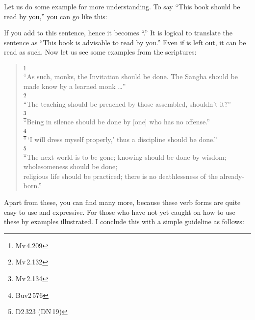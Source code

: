 Let us do some example for more understanding. To say ``This book should be read by you,'' you can go like this:


If you add  to this sentence, hence it becomes ``.'' It is logical to translate the sentence as ``This book is advisable to read by you.'' Even if  is left out, it can be read as such. Now let us see some examples from the scriptures:

\begin{quote}
\footnote{Mv\,4.209}\\
``As such, monks, the Invitation should be done. The Sangha should be made know by a learned monk \ldots''\\[1.5mm]
\footnote{Mv\,2.132}\\
``The teaching should be preached by those assembled, shouldn't it?''\\[1.5mm]
\footnote{Mv\,2.134}\\
``Being in silence should be done by [one] who has no offense.''\\[1.5mm]
\footnote{Buv2\,576}\\
``\,`I will dress myself properly,' thus a discipline should be done.''\\[1.5mm]
\footnote{D2\,323 (DN\,19)}\\
``The next world is to be gone; knowing should be done by wisdom; wholesomeness should be done; \\religious life should be practiced; there is no deathlessness of the already-born.''
\end{quote}

Apart from these, you can find many more, because these verb forms are quite easy to use and expressive. For those who have not yet caught on how to use these by examples illustrated. I conclude this with a simple guideline as follows:

